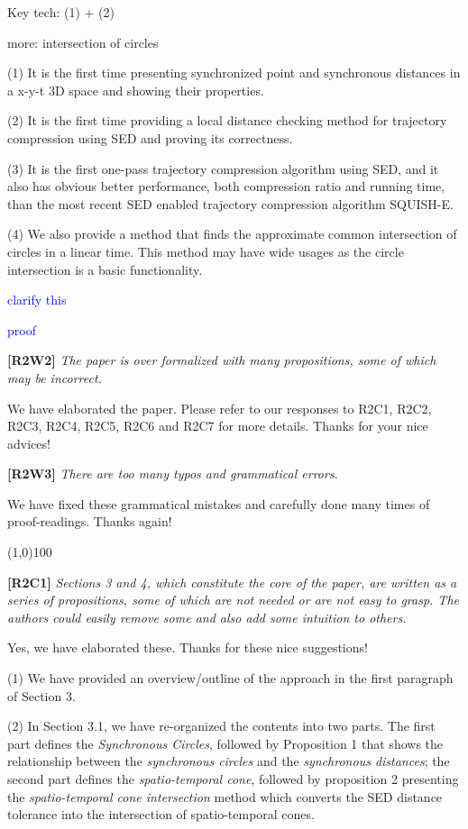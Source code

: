 \documentclass{letter}
\begin{document}
Key tech: (1) + (2)

more: intersection of circles

(1) It is the first time presenting synchronized point and synchronous distances in a x-y-t 3D space and showing their properties.

(2) It is the first time providing a local distance checking method for trajectory compression using SED and proving its correctness.

(3) It is the first one-pass trajectory compression algorithm using SED, and it also has obvious better performance, both compression ratio and running time, than the most recent SED enabled trajectory compression algorithm SQUISH-E. 

(4) We also provide a method that finds the approximate common intersection of circles in a linear time. This method may have wide usages as the circle intersection is a basic functionality.

\textcolor{blue}{clarify this} 

\textcolor{blue}{proof}

\textbf{[R2W2]} \emph{The paper is over formalized with many propositions, some of which may be incorrect.}

We have elaborated the paper. Please refer to our responses to R2C1, R2C2, R2C3, R2C4, R2C5, R2C6 and R2C7 for more details. Thanks for your nice advices!

\textbf{[R2W3]} \emph{There are too many typos and grammatical errors.}

We have fixed these grammatical mistakes and carefully done many times of proof-readings. Thanks again!

\line(1,0){100}

\textbf{[R2C1]} \emph{Sections 3 and 4, which constitute the core of the paper, are written as a series of propositions, some of which are not needed or are not easy to grasp. The authors could easily remove some and also add some intuition to others.}

Yes, we have elaborated these. Thanks for these nice suggestions!

(1) We have provided an overview/outline of the approach in the first paragraph of Section 3.

(2) In Section 3.1, we have re-organized the contents into two parts. The first part defines the \emph{Synchronous Circles}, followed by Proposition 1 that shows the relationship between the \textit{synchronous circles} and the \textit{synchronous distances}; the second part defines the \textit{spatio-temporal cone}, followed by proposition 2 presenting the \textit{spatio-temporal cone intersection} method which converts the SED distance tolerance into the intersection of spatio-temporal cones.
\end{document}
